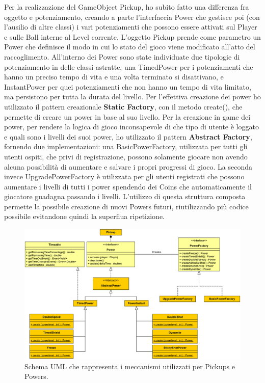 \documentclass[a4paper,12pt]{report}
\begin{document}
Per la realizzazione del GameObject Pickup, ho subito fatto una differenza fra oggetto e potenziamento, creando a parte l'interfaccia Power che gestisce poi (con l'ausilio di altre classi) i vari potenziamenti che possono essere attivati sul Player e sulle Ball interne al Level corrente.
L'oggetto Pickup prende come parametro un Power che definisce il modo in cui lo stato del gioco viene modificato all'atto del raccoglimento.
All'interno dei Power sono state individuate due tipologie di potenziamento in delle classi astratte, una TimedPower per i potenziamenti che hanno un preciso tempo di vita e una volta terminato si disattivano, e InstantPower per quei potenziamenti che non hanno un tempo di vita limitato, ma persistono per tutta la durata del livello.
Per l'effettiva creazione dei power ho utilizzato il pattern creazionale \textbf{Static Factory}, con il metodo create(), che permette di creare un power in base al suo livello.
Per la creazione in game dei power, per rendere la logica di gioco inconsapevole di che tipo di utente è loggato e quali sono i livelli dei suoi power, ho utilizzato il pattern \textbf{Abstract Factory}, fornendo due implementazioni: una BasicPowerFactory, utilizzata per tutti gli utenti ospiti, che privi di registrazione, possono solamente giocare non avendo alcuna possibilità di aumentare e salvare i propri progressi di gioco.
La seconda invece UpgradePowerFactory è utilizzata per gli utenti registrati che possono aumentare i livelli di tutti i power spendendo dei Coins che automaticamente il giocatore guadagna passando i livelli.
L'utilizzo di questa struttura composta permette la possibile creazione di nuovi Powers futuri, riutilizzando più codice possibile evitandone quindi la superflua ripetizione.

\begin{figure}[H]
\includegraphics[width=\linewidth]{img/powers}
\caption{Schema UML che rappresenta i meccanismi utilizzati per Pickups e Powers.}
\label{img:powers}
\end{figure}
\end{document}
